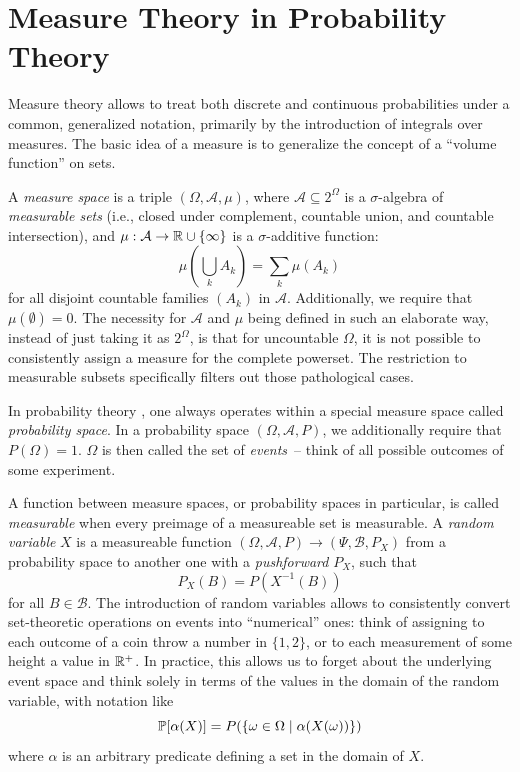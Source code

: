 \chapter{Measure Theory in Probability Theory}
\label{ch:measure-theory}

Measure theory \parencites{tao2011introduction}[section 10.5]{bronstein1995taschenbuch} allows to treat both
discrete and continuous probabilities under a common, generalized notation, primarily by the
introduction of integrals over measures.  The basic idea of a measure is to generalize the concept
of a \enquote{volume function} on sets.

A \emph{measure space} is a triple \((\Omega, \mathcal{A}, \mu)\), where
\(\mathcal{A} \subseteq 2^{\Omega}\) is a \(\sigma\)-algebra of \emph{measurable sets} (i.e., closed
under complement, countable union, and countable intersection), and
\(\mu: \mathcal{A} \to \mathbb{R} \cup \{\infty\}\) is a \(\sigma\)-additive function:
\begin{equation}
  \label{eq:sigma-additivity}
  \mu\left( \bigcup_{k} A_k \right) = \sum_{k} \mu(A_k)
\end{equation}
for all disjoint countable families \((A_k)\) in \(\mathcal{A}\).  Additionally, we require that
\(\mu(\emptyset) = 0\).  The necessity for \(\mathcal{A}\) and \(\mu\) being defined in such an
elaborate way, instead of just taking it as \(2^{\Omega}\), is that for uncountable \(\Omega\), it
is not possible to consistently assign a measure for the complete powerset.  The restriction to
measurable subsets specifically filters out those pathological cases.

In probability theory \parencite{kallenberg2006foundations}, one always operates within a special
measure space called \emph{probability space}.  In a probability space \((\Omega, \mathcal{A}, P)\),
we additionally require that \(P(\Omega) = 1\).  \(\Omega\) is then called the set of
\emph{events}~-- think of all possible outcomes of some experiment. 

A function between measure spaces, or probability spaces in particular, is called \emph{measurable}
when every preimage of a measureable set is measurable.  A \emph{random variable} \(X\) is a
measureable function \((\Omega, \mathcal{A}, P) \to (\Psi, \mathcal{B}, P_X)\) from a probability
space to another one with a \emph{pushforward} \(P_X\), such that
\begin{equation}
  \label{eq:pushforward}
  P_X(B) = P(X^{-1}(B))
\end{equation}
for all \(B \in \mathcal{B}\).  The introduction of random variables allows to consistently convert
set-theoretic operations on events into \enquote{numerical} ones: think of assigning to each outcome
of a coin throw a number in \(\{1, 2\}\), or to each measurement of some height a value in
\(\mathbb{R}^{+}\).  In practice, this allows us to forget about the underlying event space and think
solely in terms of the values in the domain of the random variable, with notation like
\begin{equation}
  \label{eq:prob-notation}
  \mathbb{P}[\alpha(X)] = P(\{\omega \in \Omega \mid \alpha(X(\omega))\})
\end{equation}
where \(\alpha\) is an arbitrary predicate defining a set in the domain of \(X\).

